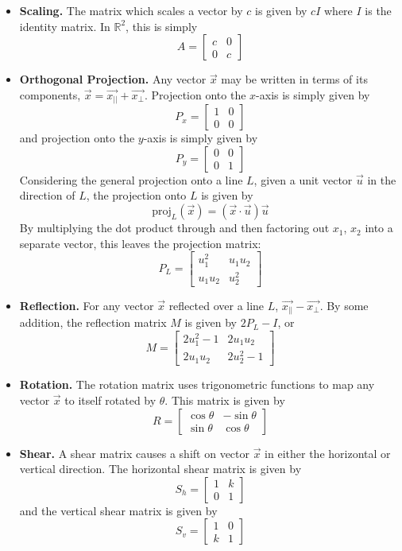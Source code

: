 \begin{itemize}
    \item[] \textbf{Scaling.} The matrix which scales a vector by $c$ is given by $cI$ where $I$ is the identity matrix. In $\mathbb{R}^2$, this is simply \[A = \begin{bmatrix}
        c & 0\\
        0 & c
    \end{bmatrix}\]
    \item[] \textbf{Orthogonal Projection.} Any vector $\vec{x}$ may be written in terms of its components, $\vec{x} = \vec{x_{||}} + \vec{x_{\perp}}$. Projection onto the $x$-axis is simply given by \[P_x = \begin{bmatrix}
        1 & 0\\
        0 & 0
    \end{bmatrix}\] and projection onto the $y$-axis is simply given by \[P_y = \begin{bmatrix}
        0 & 0\\
        0 & 1
    \end{bmatrix}\]
Considering the general projection onto a line $L$, given a unit vector $\vec{u}$ in the direction of $L$, the projection onto $L$ is given by \[\text{proj}_L(\vec{x}) = \boxed{(\vec{x}\cdot\vec{u})\vec{u}}\] By multiplying the dot product through and then factoring out $x_1$, $x_2$ into a separate vector, this leaves the projection matrix: \[P_L = \begin{bmatrix}
    u_1^2 & u_1 u_2\\
    u_1 u_2 & u_2^2
\end{bmatrix}\]
    \item[] \textbf{Reflection.} For any vector $\vec{x}$ reflected over a line $L$, $\vec{x_{||}} - \vec{x_{\perp}}$. By some addition, the reflection matrix $M$ is given by $2P_L - I$, or \[M = \begin{bmatrix} 
    2u_1^2 - 1 & 2u_1u_2\\
    2u_1u_2 & 2u_2^2 - 1
\end{bmatrix}\]
    \item[] \textbf{Rotation.} The rotation matrix uses trigonometric functions to map any vector $\vec{x}$ to itself rotated by $\theta$. This matrix is given by \[R = \begin{bmatrix}
        \cos\theta & -\sin\theta\\
        \sin\theta & \cos\theta
    \end{bmatrix}\]
    \item[] \textbf{Shear.} A shear matrix causes a shift on vector $\vec{x}$ in either the horizontal or vertical direction. The horizontal shear matrix is given by \[S_h = \begin{bmatrix}
        1 & k\\
        0 & 1
    \end{bmatrix}\] and the vertical shear matrix is given by \[S_v = \begin{bmatrix}
        1 & 0\\
        k & 1
    \end{bmatrix}\]
\end{itemize}

